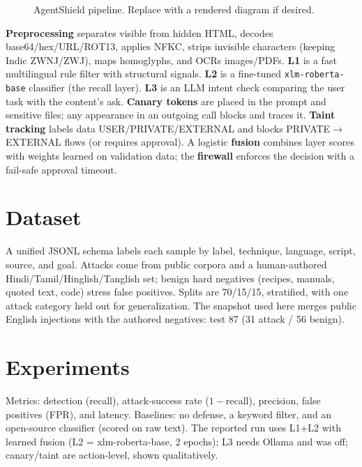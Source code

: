 \documentclass[conference]{IEEEtran}
\begin{document}
\begin{figure}[t]
\centering
{}
\caption{AgentShield pipeline. Replace with a rendered diagram if desired.}
\label{fig:arch}
\end{figure}

\textbf{Preprocessing} separates visible from hidden HTML, decodes base64/hex/URL/ROT13, applies
NFKC, strips invisible characters (keeping Indic ZWNJ/ZWJ), maps homoglyphs, and OCRs images/PDFs.
\textbf{L1} is a fast multilingual rule filter with structural signals. \textbf{L2} is a fine-tuned
\texttt{xlm-roberta-base} classifier (the recall layer). \textbf{L3} is an LLM intent check
comparing the user task with the content's ask. \textbf{Canary tokens} are placed in the prompt and
sensitive files; any appearance in an outgoing call blocks and traces it. \textbf{Taint tracking}
labels data USER/PRIVATE/EXTERNAL and blocks PRIVATE$\rightarrow$EXTERNAL flows (or requires
approval). A logistic \textbf{fusion} combines layer scores with weights learned on validation data;
the \textbf{firewall} enforces the decision with a fail-safe approval timeout.

\section{Dataset}
A unified JSONL schema labels each sample by label, technique, language, script, source, and goal.
Attacks come from public corpora and a human-authored Hindi/Tamil/Hinglish/Tanglish set; benign hard
negatives (recipes, manuals, quoted text, code) stress false positives. Splits are 70/15/15,
stratified, with one attack category held out for generalization. The snapshot used here merges
public English injections with the authored negatives: test 87 (31 attack / 56 benign).

\section{Experiments}
Metrics: detection (recall), attack-success rate ($1-$recall), precision, false positives (FPR), and
latency. Baselines: no defense, a keyword filter, and an open-source classifier (scored on raw
text). The reported run uses L1+L2 with learned fusion (L2 = xlm-roberta-base, 2 epochs); L3 needs Ollama
and was off; canary/taint are action-level, shown qualitatively.
\end{document}
